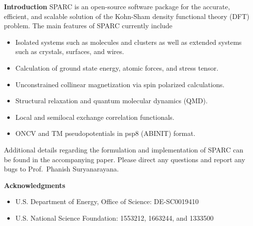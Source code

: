\begin{frame}[allowframebreaks]{\textbf{Introduction}} \label{Introduction}
SPARC is an open-source software package for the accurate, efficient, and scalable solution of the Kohn-Sham density functional theory (DFT) problem. The main features of SPARC currently include
\begin{itemize}
  \item Isolated systems such as molecules and clusters as well as extended systems such as crystals, surfaces, and wires. 
  \item Calculation of ground state energy, atomic forces, and stress tensor.
  \item Unconstrained collinear magnetization via spin polarized calculations.
  \item Structural relaxation and quantum molecular dynamics (QMD). 
  \item Local and semilocal exchange correlation functionals. 
  \item ONCV and TM pseudopotentials in psp8 (ABINIT) format. 
\end{itemize}
Additional details regarding the formulation and implementation of SPARC can be found in the accompanying paper. Please direct any questions and report any bugs to Prof.~Phanish Suryanarayana.

\end{frame}


\begin{frame}[allowframebreaks]{\textbf{Acknowledgments}} \label{Acknowledgments}

\begin{itemize}
    \item U.S. Department of Energy, Office of Science: DE-SC0019410
    \item U.S. National Science Foundation: 1553212, 1663244, and 1333500
\end{itemize}

\end{frame}


